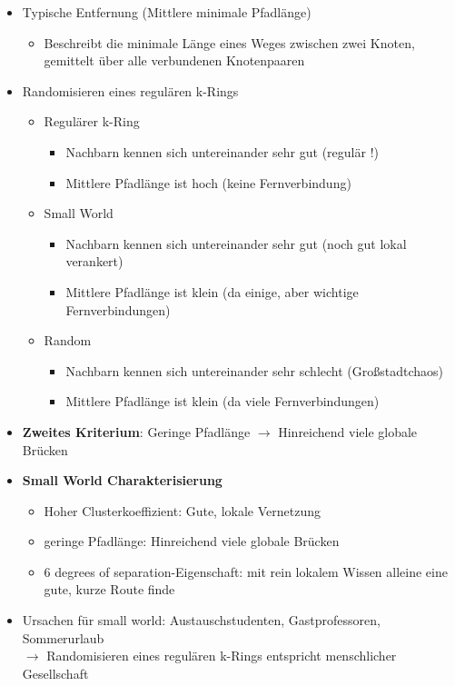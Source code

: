 \documentclass{article} %
\begin{document}
\begin{itemize}
\begin{itemize}
\begin{center}
			\end{center}
		\end{itemize}
		\item Typische Entfernung (Mittlere minimale Pfadlänge)
		\begin{itemize}
			\item Beschreibt die minimale Länge eines Weges zwischen zwei Knoten, gemittelt über alle verbundenen Knotenpaaren
		\end{itemize}
		\item Randomisieren eines regulären k-Rings
		\begin{itemize}
			\item Regulärer k-Ring
			\begin{itemize}
				\item Nachbarn kennen sich untereinander sehr gut (regulär !)
				\item Mittlere Pfadlänge ist hoch (keine Fernverbindung)
			\end{itemize}
			\item Small World
			\begin{itemize}
				\item Nachbarn kennen sich untereinander sehr gut (noch gut lokal verankert)
				\item Mittlere Pfadlänge ist klein (da einige, aber wichtige Fernverbindungen)
			\end{itemize}
			\item Random 
			\begin{itemize}
				\item Nachbarn kennen sich untereinander sehr schlecht (Großstadtchaos)
				\item Mittlere Pfadlänge ist klein (da viele Fernverbindungen)
			\end{itemize}
		\end{itemize}
		\item \textbf{Zweites Kriterium}: Geringe Pfadlänge $\rightarrow$ Hinreichend viele globale Brücken
		\item \textbf{Small World Charakterisierung}
		\begin{itemize}
			\item Hoher Clusterkoeffizient: Gute, lokale Vernetzung
			\item geringe Pfadlänge: Hinreichend viele globale Brücken
			\item 6 degrees of separation-Eigenschaft: mit rein lokalem Wissen alleine eine gute, kurze Route finde
		\end{itemize}
		\item Ursachen für small world: Austauschstudenten, Gastprofessoren, Sommerurlaub\\
		$\rightarrow$ Randomisieren eines regulären k-Rings entspricht menschlicher Gesellschaft
	\end{itemize}
\end{document}
